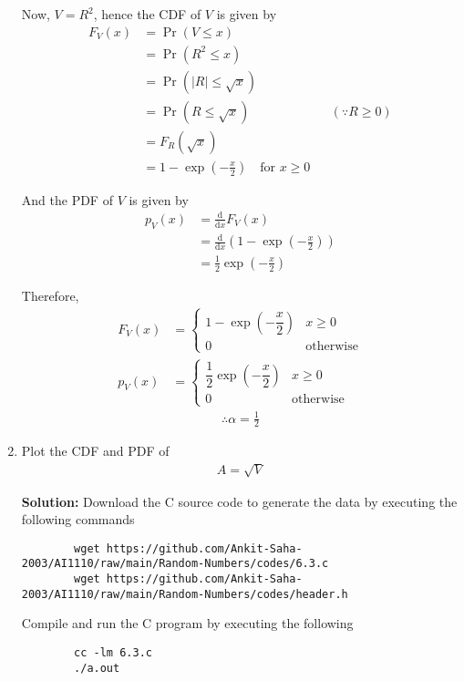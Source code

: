 \documentclass[journal,12pt,twocolumn]{IEEEtran}
\newcommand{\solution}{\noindent \textbf{Solution: }}
\providecommand{\pr}[1]{\ensuremath{\Pr\left(#1\right)}}
\providecommand{\brak}[1]{\ensuremath{\left(#1\right)}}
\providecommand{\der}[1]{\mathrm{d} #1}
\numberwithin{equation}{section}
\renewcommand\thesection{\arabic{section}}
\begin{document}
\begin{enumerate}[label=\thesection.\arabic*,ref=\thesection.\theenumi]
	Now, $V = R^2$, hence the CDF of $V$ is given by
	\begin{align}
		F_V(x) &= \pr{V \le x} \\
		&= \pr{R^2 \le x} \\
		&= \pr{|R| \le \sqrt{x}} \\
		&= \pr{R \le \sqrt{x}} && (\because R \ge 0) \\
		&= F_R(\sqrt{x}) \\
		&= 1 - \exp\brak{-\frac{x}{2}} \quad \text{for } x \ge 0
	\end{align}
	
	And the PDF of $V$ is given by
	\begin{align}
		p_V(x) &= \frac{\der{}}{\der{x}} F_V(x) \\
		&= \frac{\der{}}{\der{x}} \brak{1 - \exp\brak{-\frac{x}{2}}} \\
		&= \frac12 \exp\brak{-\frac{x}{2}} 
	\end{align}
	
	Therefore,
	\begin{align}
		F_V(x) &= 
		\begin{cases}
			1 - \exp\brak{-\dfrac{x}{2}} & x \geq 0 \\
			0 & \text{otherwise}
		\end{cases}	\\
		p_V(x) &= 
		\begin{cases}
			\dfrac12 \exp\brak{-\dfrac{x}{2}} & x \geq 0 \\
			0 & \text{otherwise}
		\end{cases}
	\end{align}
	\begin{align}
		\therefore \alpha = \frac12
	\end{align}
	
	\item Plot the CDF and PDF of
	\begin{align}
		A = \sqrt{V}
	\end{align}
	
	\solution Download the C source code to generate the data by executing the following commands
	\begin{lstlisting}
		wget https://github.com/Ankit-Saha-2003/AI1110/raw/main/Random-Numbers/codes/6.3.c
		wget https://github.com/Ankit-Saha-2003/AI1110/raw/main/Random-Numbers/codes/header.h
	\end{lstlisting}
	Compile and run the C program by executing the following
	\begin{lstlisting}
		cc -lm 6.3.c
		./a.out
	\end{lstlisting}
	

\end{enumerate}
\end{document}
